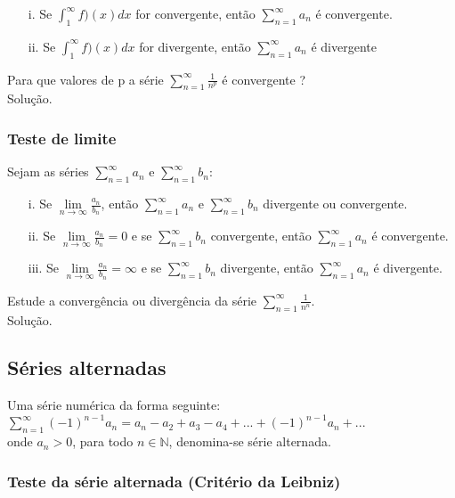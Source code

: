 \begin{itemize}
	\item[i.] Se $\int_{1}^{\infty}f)(x)dx$ for convergente, então $\sum_{n=1}^{\infty}a_{n}$ é convergente.
	\item[ii.] Se $\int_{1}^{\infty}f)(x)dx$ for divergente, então $\sum_{n=1}^{\infty}a_{n}$ é divergente
\end{itemize}
\begin{ex}
	Para que valores de p a série $\sum_{n=1}^{\infty}\frac{1}{n^{p}}$ é convergente ?\\
	Solução.
\end{ex}
\vspace*{8cm}
\subsubsection{Teste de limite}
Sejam as séries $\sum_{n=1}^{\infty}a_{n}$ e $\sum_{n=1}^{\infty}b_{n}$: \\
\begin{itemize}
	\item[i.] Se $\lim\limits_{n\rightarrow \infty}\frac{a_{n}}{b_{n}}$, então $\sum_{n=1}^{\infty}a_{n}$ e $\sum_{n=1}^{\infty}b_{n}$ divergente ou convergente.
	\item[ii.] Se $\lim\limits_{n\rightarrow \infty}\frac{a_{n}}{b_{n}}=0$ e se $\sum_{n=1}^{\infty}b_{n}$ convergente, então $\sum_{n=1}^{\infty}a_{n}$ é convergente.
	\item[iii.] Se $\lim\limits_{n\rightarrow \infty}\frac{a_{n}}{b_{n}}=\infty$ e se $\sum_{n=1}^{\infty}b_{n}$ divergente, então $\sum_{n=1}^{\infty}a_{n}$ é divergente.
\end{itemize} 
\begin{ex}
	Estude a convergência ou divergência da série $\sum_{n=1}^{\infty}\frac{1}{n^{n}}$.\\
	Solução.
\end{ex}
\vspace*{7cm}
\subsection{Séries alternadas}
Uma série numérica da forma seguinte:\\

$\sum_{n=1}^{\infty}(-1)^{n-1}a_{n}=a_{n}-a_{2}+a_{3}-a_{4}+...+(-1)^{n-1}a_{n}+...$\\
onde $a_{n}>0$, para todo $n\in \mathbb{N}$, denomina-se série alternada.
\subsubsection{Teste da série alternada (Critério da Leibniz)} 

